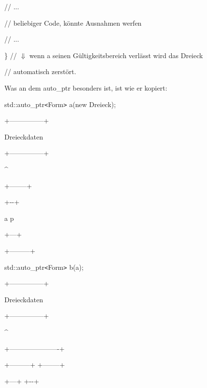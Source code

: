 \documentclass{article}
\begin{document}
// ...    

\parindent=28pt
// beliebiger Code, könnte Ausnahmen werfen    

\parindent=14pt
// ... 

\parindent=0pt
\}   // \ensuremath{\Downarrow} wenn a seinen Gültigkeitsbereich verlässt wird 
das Dreieck     

\parindent=14pt
// automatisch zerstört.

\vspace{12pt}
\parindent=0pt
Was an dem auto\_ptr besonders ist, ist wie er kopiert:

std::auto\_ptr\texttt{<}Form\texttt{>} a(new Dreieck);      

\vspace{12pt}
\parindent=21pt
+---------------+      

\textbar{}  Dreieckdaten \textbar{}      

+---------------+        

\parindent=50pt
\textasciicircum{}        

\parindent=28pt
\textbar{}        

\textbar{}        

\parindent=57pt
\textbar{}  

\parindent=7pt
+-----\textbar{}---+  

\textbar{}   +-\textbar{}-+ \textbar{}

a \textbar{} p \textbar{} \textbar{} \textbar{} \textbar{}  

\parindent=14pt
\textbar{}   +---+ \textbar{}  

\parindent=7pt
+---------+

\vspace{51pt}
\parindent=0pt
std::auto\_ptr\texttt{<}Form\texttt{>} b(a);      

\vspace{12pt}
\parindent=21pt
+---------------+      

\textbar{}  Dreieckdaten \textbar{}      

+---------------+        

\parindent=50pt
\textasciicircum{}        

\parindent=28pt
\textbar{}        

+----------------------+                               

\parindent=140pt
\textbar{}  

\parindent=7pt
+---------+            +-----\textbar{}---+  

\textbar{}   +---+ \textbar{}            \textbar{}   +-\textbar{}-+ \textbar{}
\end{document}
